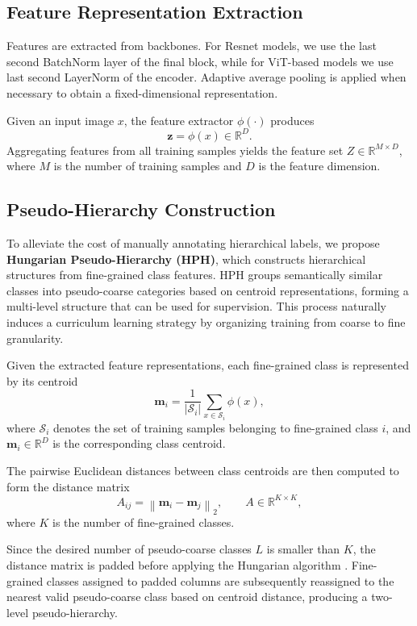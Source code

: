\documentclass[conference,a4paper]{IEEEtran}
\begin{document}
\subsection{Feature Representation Extraction}
Features are extracted from backbones. For Resnet models, we use the last second BatchNorm layer  of the final block, while for ViT-based models we use last second LayerNorm of the encoder. Adaptive average pooling is applied when necessary to obtain a fixed-dimensional representation.

Given an input image $x$, the feature extractor $\phi(\cdot)$ produces
\[
\mathbf{z} = \phi(x) \in \mathbb{R}^{D}.
\]
Aggregating features from all training samples yields the feature set $Z \in \mathbb{R}^{M \times D}$, where $M$ is the number of training samples and $D$ is the feature dimension.

\subsection{Pseudo-Hierarchy Construction}
To alleviate the cost of manually annotating hierarchical labels, we propose \textbf{Hungarian Pseudo-Hierarchy (HPH)}, which constructs hierarchical structures from fine-grained class features. HPH groups semantically similar classes into pseudo-coarse categories based on centroid representations, forming a multi-level structure that can be used for supervision. This process naturally induces a curriculum learning strategy by organizing training from coarse to fine granularity.

Given the extracted feature representations, each fine-grained class is represented by its centroid
\[
\mathbf{m}_i
=
\frac{1}{|\mathcal{S}_i|}
\sum_{x\in\mathcal{S}_i}
\phi(x),
\]
where $\mathcal{S}_i$ denotes the set of training samples belonging to fine-grained class $i$, and $\mathbf{m}_i\in\mathbb{R}^{D}$ is the corresponding class centroid.


The pairwise Euclidean distances between class centroids are then computed to form the distance matrix
\[
A_{ij}
=
\left\|
\mathbf{m}_i-\mathbf{m}_j
\right\|_2,
\qquad
A\in\mathbb{R}^{K\times K},
\]
where $K$ is the number of fine-grained classes.

Since the desired number of pseudo-coarse classes $L$ is smaller than $K$, the distance matrix is padded before applying the Hungarian algorithm \cite{kuhn_hungarian_1955}. Fine-grained classes assigned to padded columns are subsequently reassigned to the nearest valid pseudo-coarse class based on centroid distance, producing a two-level pseudo-hierarchy.
\end{document}
